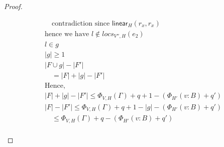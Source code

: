 \documentclass[11pt]{article}
\newcommand{\ms}[1]{\ensuremath{\mathsf{#1}}}
\begin{document}
\begin{proof}
\begin{description}
\begin{align*}
  &\quad \text{contradiction since } \ms{linear}_H(r_x,r_x)\\
  &\text{hence we have } l \notin locs_{V'',H}(e_2)\\
  &l \in g \tag{def of $g$}\\
  &|g| \ge 1\\
  &|F \cup g| - |F'|\\
  &\quad = |F| + |g| - |F'| \tag{$F,g$ disjoint}\\
  &\text{Hence,}\\
  &|F| + |g| - |F'| \le  \Phi_{V,H}(\Gamma) + q + 1 - (\Phi_{H'}(v:B) + q')\\
  &|F| - |F'| \le \Phi_{V,H}(\Gamma) + q + 1 - |g| - (\Phi_{H'}(v:B) + q')\\
  &\quad \le \Phi_{V,H}(\Gamma) + q - (\Phi_{H'}(v:B) + q') \tag{$|g| \ge 1$}\\
  \end{align*}
  \end{description}
\end{proof}
\end{document}
